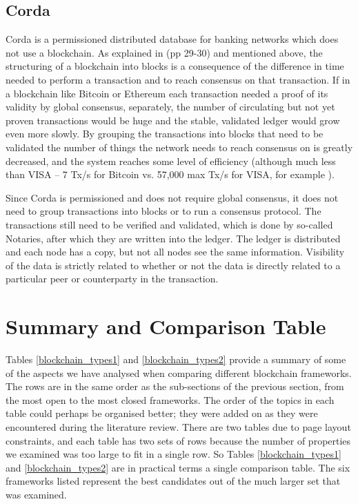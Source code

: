 \subsection{Corda}
Corda \cite{Hearn2016} is a permissioned distributed database for banking networks which does not use a blockchain. As explained  in \cite{Hearn2016} (pp 29-30) and mentioned above, the structuring of a blockchain into blocks is a consequence of the difference in time needed to perform a transaction and to reach consensus on that transaction. If in a blockchain like Bitcoin or Ethereum each transaction needed a proof of its validity by global consensus, separately, the number of circulating but not yet proven transactions would be huge and the stable, validated ledger would grow even more slowly. By grouping the transactions into blocks that need to be validated the number of things the network needs to reach consensus on is greatly decreased, and the system reaches some level of efficiency (although much less than VISA -- 7 Tx/s for Bitcoin vs. 57,000 max Tx/s for VISA, for example \cite{Antonopoulos2015}).

Since Corda is permissioned and does not require global consensus, it does not need to group transactions into blocks or to run a consensus protocol. The transactions still need to be verified and validated, which is done by so-called Notaries, after which they are written into the ledger. The ledger is distributed and each node has a copy, but not all nodes see the same information. Visibility of the data is strictly related to whether or not the data is directly related to a particular peer or counterparty in the transaction.

\section{Summary and Comparison Table}
Tables \ref{blockchain_types1} and \ref{blockchain_types2} provide a summary of some of the aspects we have analysed when comparing different blockchain frameworks. The rows are in the same order as the sub-sections of the previous section, from the most open to the most closed frameworks. The order of the topics in each table could perhaps be organised better; they were added on as they were encountered during the literature review. There are two tables due to page layout constraints, and each table has two sets of rows because the number of properties we examined was too large to fit in a single row. So Tables \ref{blockchain_types1} and \ref{blockchain_types2} are in practical terms a single comparison table. The six frameworks listed represent the best candidates out of the much larger set that was examined.

